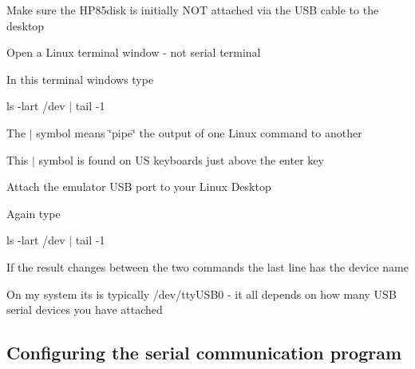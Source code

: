 \begin{DoxyItemize}
\item Make sure the H\+P85disk is initially N\+OT attached via the U\+SB cable to the desktop
\item Open a Linux terminal window -\/ not serial terminal
\item In this terminal windows type
\begin{DoxyItemize}
\item ls -\/lart /dev $\vert$ tail -\/1
\begin{DoxyItemize}
\item The \textquotesingle{}$\vert$\textquotesingle{} symbol means \char`\"{}pipe\char`\"{} the output of one Linux command to another
\begin{DoxyItemize}
\item This \textquotesingle{}$\vert$\textquotesingle{} symbol is found on US keyboards just above the enter key
\end{DoxyItemize}
\end{DoxyItemize}
\end{DoxyItemize}
\item Attach the emulator U\+SB port to your Linux Desktop
\begin{DoxyItemize}
\item Again type
\begin{DoxyItemize}
\item ls -\/lart /dev $\vert$ tail -\/1
\begin{DoxyItemize}
\item If the result changes between the two commands the last line has the device name
\begin{DoxyItemize}
\item On my system its is typically /dev/tty\+U\+S\+B0 -\/ it all depends on how many U\+SB serial devices you have attached
\end{DoxyItemize}
\end{DoxyItemize}
\end{DoxyItemize}
\end{DoxyItemize}
\end{DoxyItemize}

\subsection*{Configuring the serial communication program}


